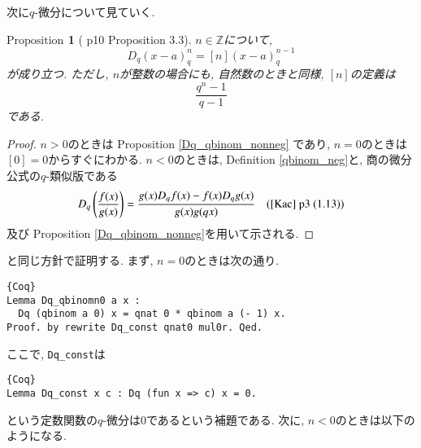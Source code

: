 \documentclass[11pt]{jsreport}
\theoremstyle{mystyle}
\newtheorem{prop}[df]{$\textrm{Proposition}$}
\newcommand{\bprop}{\begin{shadebox} \begin{prop}}
\newcommand{\eprop}{\end{prop} \end{shadebox}}
\newcommand{\bpf}{\begin{proof}}
\newcommand{\epf}{\end{proof}}
\newcommand{\Z}{\mathbb{Z}}
\newcommand{\0}{\textbf{0}}
\newcommand{\1}{\textbf{1}}
\newcommand{\2}{\textbf{2}}
\begin{document}
次に$q$-微分について見ていく.  
\bprop[\cite{Kac} p10 Proposition 3.3]
  $n \in \Z$について, 
  \[
    D_q (x - a)^n_q = [n] (x - a)^{n - 1}_q
  \]
  が成り立つ. ただし, $n$が整数の場合にも, 自然数のときと同様, $[n]$の定義は
  \[
    \frac{q^n - 1}{q - 1}
  \]
  である. 
\eprop
\bpf
  $n > 0$のときは Proposition \ref{Dq_qbinom_nonneg} であり, $n = 0$のときは$[0] = 0$からすぐにわかる. 
  $n < 0$のときは, Definition \ref{qbinom_neg}と, 商の微分公式の$q$-類似版である
  \[
    D_q \left( \frac{f(x)}{g(x)} \right) = \frac{g(x) D_q f(x) - f(x) D_q g(x)}{g(x) g(qx)} \quad
    \text{(\cite{Kac} p3 (1.13))}
  \]
  及び Proposition \ref{Dq_qbinom_nonneg}を用いて示される. 
\epf
\cite{Kac}と同じ方針で証明する. まず, $n = 0$のときは次の通り. 
\begin{lstlisting}{Coq}
Lemma Dq_qbinomn0 a x :
  Dq (qbinom a 0) x = qnat 0 * qbinom a (- 1) x.
Proof. by rewrite Dq_const qnat0 mul0r. Qed. \end{lstlisting}
ここで, {\tt Dq\_const}は
\begin{lstlisting}{Coq}
Lemma Dq_const x c : Dq (fun x => c) x = 0. \end{lstlisting}
という定数関数の$q$-微分は$0$であるという補題である. 次に, $n < 0$のときは以下のようになる. 
\end{document}
